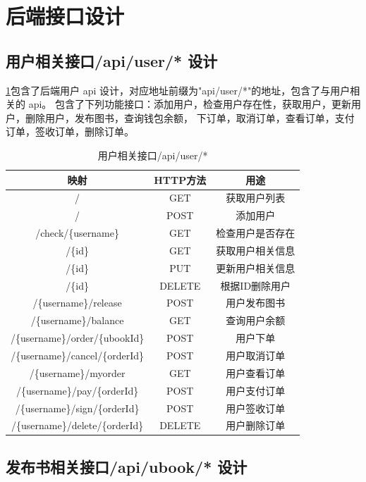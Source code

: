 \section{后端接口设计}
\subsection{用户相关接口/api/user/* 设计}

\cref{api_user}包含了后端用户 api 设计，对应地址前缀为"api/user/*"的地址，包含了与用户相关的 api。
包含了下列功能接口：添加用户，检查用户存在性，获取用户，更新用户，删除用户，发布图书，查询钱包余额，
下订单，取消订单，查看订单，支付订单，签收订单，删除订单。

\begin{table}[h]
	\centering
	\caption{用户相关接口/api/user/*}
	\label{api_user}
	\begin{tabular}{ccc}
		\toprule
		\textbf{映射} & \textbf{HTTP方法} & \textbf{用途} \\
		\midrule
		/ & GET & 获取用户列表  \\
		/ & POST & 添加用户 \\
		/check/\{username\} & GET &  检查用户是否存在 \\
		/\{id\} & GET & 获取用户相关信息 \\
		/\{id\} & PUT &  更新用户相关信息 \\
		/\{id\} & DELETE & 根据ID删除用户 \\
		/\{username\}/release & POST & 用户发布图书 \\
		/\{username\}/balance & GET & 查询用户余额 \\
		/\{username\}/order/\{ubookId\} & POST & 用户下单 \\
		/\{username\}/cancel/\{orderId\} & POST &  用户取消订单 \\
		/\{username\}/myorder & GET & 用户查看订单 \\
		/\{username\}/pay/\{orderId\} & POST & 用户支付订单 \\
		/\{username\}/sign/\{orderId\} & POST & 用户签收订单 \\
		/\{username\}/delete/\{orderId\} & DELETE & 用户删除订单 \\
			\bottomrule
	\end{tabular}
\end{table}

\subsection{发布书相关接口/api/ubook/* 设计}

